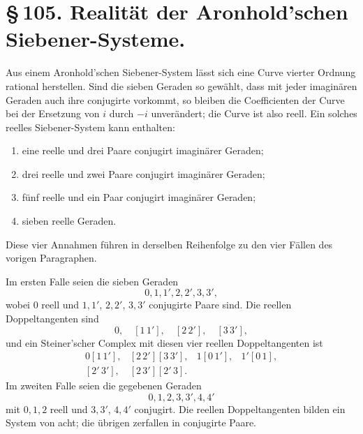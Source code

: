 \documentclass[11pt]{article}
\providecommand{\pair}[2]{[#1\,#2]}
\begin{document}
\section*{\S\,105. Realität der Aronhold'schen Siebener-Systeme.}

Aus einem Aronhold'schen Siebener-System lässt sich eine Curve vierter Ordnung rational herstellen. Sind die sieben Geraden so gewählt, dass mit jeder imaginären Geraden auch ihre conjugirte vorkommt, so bleiben die Coefficienten der Curve bei der Ersetzung von \(i\) durch \(-i\) unverändert; die Curve ist also reell. Ein solches reelles Siebener-System kann enthalten:
\begin{enumerate}[label=\arabic*)]
\item eine reelle und drei Paare conjugirt imaginärer Geraden;
\item drei reelle und zwei Paare conjugirt imaginärer Geraden;
\item fünf reelle und ein Paar conjugirt imaginärer Geraden;
\item sieben reelle Geraden.
\end{enumerate}
Diese vier Annahmen führen in derselben Reihenfolge zu den vier Fällen des vorigen Paragraphen.

Im ersten Falle seien die sieben Geraden
\[
 0,
 1,
 1',
 2,
 2',
 3,
 3',
\]
wobei \(0\) reell und \(1,1'\), \(2,2'\), \(3,3'\) conjugirte Paare sind. Die reellen Doppeltangenten sind
\[
0,\quad \pair{1}{1'},\quad \pair{2}{2'},\quad \pair{3}{3'},
\]
und ein Steiner'scher Complex mit diesen vier reellen Doppeltangenten ist
\[
\begin{array}{llll}
0\pair{1}{1'},&\pair{2}{2'}\pair{3}{3'},&1\pair{0}{1'},&1'\pair{0}{1},\\
\pair{2}{3}\pair{2'}{3'},&\pair{2}{3'}\pair{2'}{3}.&&
\end{array}
\]
Im zweiten Falle seien die gegebenen Geraden
\[
0,1,2,3,3',4,4'
\]
mit \(0,1,2\) reell und \(3,3'\), \(4,4'\) conjugirt. Die reellen Doppeltangenten bilden ein System von acht; die übrigen zerfallen in conjugirte Paare.
\end{document}
